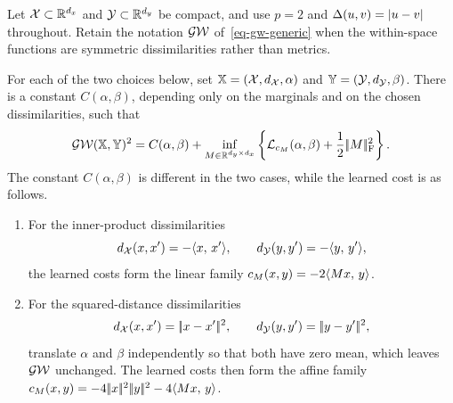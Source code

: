 \begin{prop}\label{prop-gw-euclidean-cost-regularization}
	Let $\mathcal{X}\subset\mathbb{R}^{d_x}$ and $\mathcal{Y}\subset\mathbb{R}^{d_y}$ be compact, and use $p=2$ and $\Delta(u,v)=|u-v|$ throughout. Retain the notation $\operatorname{\mathcal{GW}}$ of~\eqref{eq-gw-generic} when the within-space functions are symmetric dissimilarities rather than metrics.

	For each of the two choices below, set $\mathbb{X}=(\mathcal{X},d_{\mathcal{X}},\alpha)$ and $\mathbb{Y}=(\mathcal{Y},d_{\mathcal{Y}},\beta)$. There is a constant $C(\alpha,\beta)$, depending only on the marginals and on the chosen dissimilarities, such that
	\begin{equation}\label{eq-gw-euclidean-cost-learning}
		\operatorname{\mathcal{GW}}(\mathbb{X},\mathbb{Y})^2
		=
		C(\alpha,\beta)
		+
		\inf_{M\in\mathbb{R}^{d_y\times d_x}}
		\left\{\mathcal{L}_{c_M}(\alpha,\beta)+\frac12|\!| M |\!|_{\mathrm F}^2\right\}.
	\end{equation}
	The constant $C(\alpha,\beta)$ is different in the two cases, while the learned cost is as follows.
	\begin{enumerate}
		\item For the inner-product dissimilarities
		\begin{equation}\label{eq-gw-inner-product-dissimilarities}
			d_{\mathcal{X}}(x,x')=-\langle x,\,x'\rangle,
			\qquad
			d_{\mathcal{Y}}(y,y')=-\langle y,\,y'\rangle,
		\end{equation}
		the learned costs form the linear family
		$c_M(x,y)=-2\langle Mx,\,y\rangle$.
		\item For the squared-distance dissimilarities
		\begin{equation}\label{eq-gw-squared-distance-dissimilarities}
			d_{\mathcal{X}}(x,x')=|\!| x-x' |\!|^2,
			\qquad
			d_{\mathcal{Y}}(y,y')=|\!| y-y' |\!|^2,
		\end{equation}
		translate $\alpha$ and $\beta$ independently so that both have zero mean, which leaves $\operatorname{\mathcal{GW}}$ unchanged. The learned costs then form the affine family
		$c_M(x,y)=-4|\!| x |\!|^2|\!| y |\!|^2-4\langle Mx,\,y\rangle$.
	\end{enumerate}
\end{prop}
